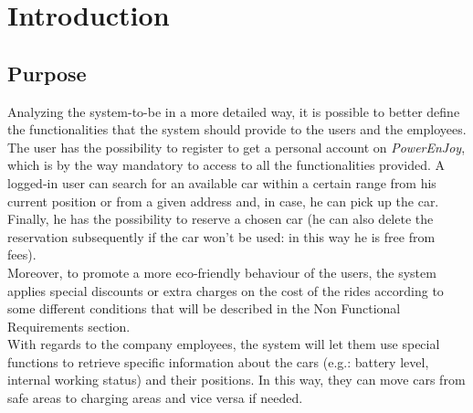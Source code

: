 \documentclass[11pt,a4paper]{report}
\begin{document}


\thispagestyle{empty}
\tableofcontents
\listoffigures
\cleardoublepage
{}
\pagestyle{fancy}
\chapter{Introduction}
\section{Purpose}
Analyzing the system-to-be in a more detailed way, it is possible to better define the functionalities that the system should provide to the users and the employees.\\
The user has the possibility to register to get a personal account on \textit{PowerEnJoy}, which is by the way mandatory to access to all the functionalities provided. A logged-in user can search for an available car within a certain range from his current position or from a given address and, in case, he can pick up the car. Finally, he has the possibility to reserve a chosen car (he can also delete the reservation subsequently if the car won't be used: in this way he is free from fees).\\
Moreover, to promote a more eco-friendly behaviour of the users, the system applies special discounts or extra charges on the cost of the rides according to some different conditions that will be described in the Non Functional Requirements section.\\ 
With regards to the company employees, the system will let them use special functions to retrieve specific information about the cars (e.g.: battery level, internal working status) and their positions. In this way, they can move cars from safe areas to charging areas and vice versa if needed.
\end{document}

